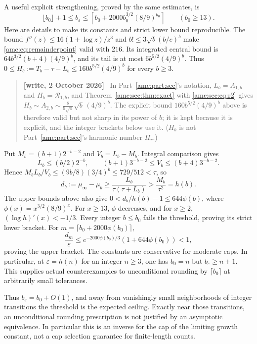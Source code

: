 \documentclass[11pt,letterpaper]{article}
\theoremstyle{remark}\newtheorem{remark}[theorem]{Remark}
\newenvironment{writenote}{\par\smallskip\begin{quote}\small\textbf{[write, 2 October 2026]}\ }{\end{quote}\smallskip}
\begin{document}
A useful explicit strengthening, proved by the same estimates, is
\begin{equation}\label{amc:eq:explicitround}
 \lfloor b_0\rfloor+1\le b_\varepsilon\le
 \left\lceil b_0+2000b_0^{3/2}(8/9)^{b_0}\right\rceil
 \qquad(b_0\ge13).
\end{equation}
Here are details to make its constants and strict lower bound reproducible. The bound
$f''(z)\le16(1+\log z)/z^3$ and $b!\le3\sqrt b(b/e)^b$ make
\eqref{amc:eq:remainderpoint} valid with $216$. Its integrated central bound is
$64b^{3/2}(b+4)(4/9)^b$, and its tail is at most $6b^{5/2}(4/9)^b$.
Thus $0\le H_b:=T_b-\tau-L_b\le160b^{5/2}(4/9)^b$ for every $b\ge3$.
\begin{writenote}
In Part~\ref{amc:part:sec}'s notation, $L_b=A_{1,b}$ and $H_b=\mathcal R_{1,b}$, and Theorem~\ref{amc:sec:thm:exact} with \eqref{amc:sec:eq:r2} gives $H_b\sim A_{2,b}\sim\frac8{9\sqrt\pi}\sqrt b\,(4/9)^b$. The explicit bound $160b^{5/2}(4/9)^b$ above is therefore valid but not sharp in its power of $b$; it is kept because it is explicit, and the integer brackets below use it. ($H_b$ is not Part~\ref{amc:part:sec}'s harmonic number $H_r$.)
\end{writenote}
Put $M_b=(b+1)2^{-b-2}$ and $V_b=L_b-M_b$. Integral comparison gives
\[
 L_b\le (b/2)2^{-b},\qquad
 (b+1)3^{-b-2}\le V_b\le(b+4)3^{-b-2}.
\]
Hence $M_bL_b/V_b\le(9b/8)(3/4)^b\le729/512<\tau$, so
\[
 d_b:=\mu_\infty-\mu_b\ge\frac{L_b}{\tau(\tau+L_b)}>
 \frac{M_b}{\tau^2}=h(b).
\]
The upper bounds above also give
$0<d_b/h(b)-1\le644\phi(b)$, where $\phi(x)=x^{3/2}(8/9)^x$.
For $x\ge13$, $\phi$ decreases, and for $x\ge2$,
$(\log h)'(x)<-1/3$. Every integer $b\le b_0$ fails the threshold, proving
its strict lower bracket. For $m=\lceil b_0+2000\phi(b_0)\rceil$,
\[
 \frac{d_m}{\varepsilon}\le
 e^{-2000\phi(b_0)/3}(1+644\phi(b_0))<1,
\]
proving the upper bracket. The constants are conservative for moderate caps.
In particular, at $\varepsilon=h(n)$ for an integer $n\ge3$, one has
$b_0=n$ but $b_\varepsilon\ge n+1$. This supplies actual counterexamples
to unconditional rounding by $\lceil b_0\rceil$ at arbitrarily small tolerances.

Thus $b_\varepsilon=b_0+O(1)$, and away from vanishingly small neighborhoods of integer transitions the threshold is the expected ceiling. Exactly near those transitions, an unconditional rounding prescription is not justified by an asymptotic equivalence. In particular this is an inverse for the cap of the limiting growth constant, not a cap selection guarantee for finite-length counts.
\end{document}

